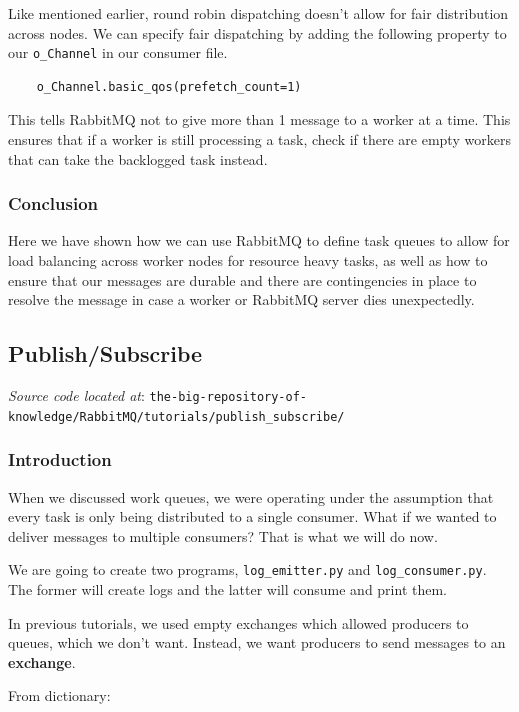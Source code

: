 \documentclass{article}
\begin{document}
Like mentioned earlier, round robin dispatching doesn't allow for fair distribution across nodes. We can specify fair dispatching by adding the following property to our \verb|o_Channel| in our consumer file.

\begin{verbatim}
    o_Channel.basic_qos(prefetch_count=1)
\end{verbatim}

This tells RabbitMQ not to give more than 1 message to a worker at a time. This ensures that if a worker is still processing a task, check if there are empty workers that can take the backlogged task instead.

\subsubsection{Conclusion}

Here we have shown how we can use RabbitMQ to define task queues to allow for load balancing across worker nodes for resource heavy tasks, as well as how to ensure that our messages are durable and there are contingencies in place to resolve the message in case a worker or RabbitMQ server dies unexpectedly.

\subsection{Publish/Subscribe}

\textit{Source code located at}: \verb|the-big-repository-of-knowledge/RabbitMQ/tutorials/publish_subscribe/|

\subsubsection{Introduction}

When we discussed work queues, we were operating under the assumption that every task is only being distributed to a single consumer. What if we wanted to deliver messages to multiple consumers? That is what we will do now.

We are going to create two programs, \verb|log_emitter.py| and \verb|log_consumer.py|. The former will create logs and the latter will consume and print them.

In previous tutorials, we used empty exchanges which allowed producers to queues, which we don't want. Instead, we want producers to send messages to an \textbf{exchange}. 

From dictionary:
\end{document}
